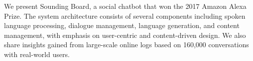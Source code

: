We present Sounding Board, a social chatbot that won the 2017 Amazon Alexa Prize. The system architecture consists of several components including spoken language processing, dialogue management, language generation, and content management, with emphasis on user-centric and content-driven design. We also share insights gained from large-scale online logs based on 160,000 conversations with real-world users.
